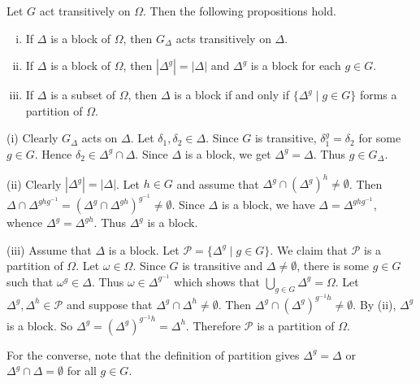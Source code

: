 \begin{proposition} \label{prop-block}
	Let $G$ act transitively on $\Omega$.  Then the following propositions hold.
	\begin{enumerate}[(i)]
		\item If $\Delta$ is a block of $\Omega$, then $G_{\Delta}$ acts transitively on $\Delta$. 
		\item If $\Delta$ is a block of $\Omega$, then $|\Delta^g| = |\Delta|$ and $\Delta^g$ is a block for each $g\in G$. 
		\item If $\Delta$ is a subset of $\Omega$, then $\Delta$ is a block if and only if $\{\Delta^g\mid g\in G\}$ forms a partition of $\Omega$.
	\end{enumerate}  
\end{proposition}
\begin{sketch}
	(i) Clearly $G_{\Delta}$ acts on $\Delta$. Let $\delta_1,\delta_2\in\Delta$. Since $G$ is transitive, $\delta_1^g = \delta_2$ for some $g\in G$. Hence $\delta_2\in \Delta^g\cap \Delta$. Since $\Delta$ is a block, we get $\Delta^g = \Delta$. Thus $g\in G_\Delta$.
	
	(ii) Clearly $|\Delta^g| = |\Delta|$.  Let $h\in G$ and assume that  $\Delta^g \cap (\Delta^g)^h \neq \emptyset$. Then $\Delta \cap \Delta^{g h g^{-1}}  = (\Delta^g \cap \Delta^{gh})^{g^{-1}} \neq \emptyset$. Since $\Delta$ is a block, we have  $\Delta = \Delta^{g h g^{-1}}$, whence $\Delta^g = \Delta^{g h}$. Thus $\Delta^g$ is a block.
	
	(iii) Assume that $\Delta$ is a block. Let $\mathcal{P} = \{\Delta^g \mid g \in G\}$. We claim that $\mathcal{P}$ is a partition of $\Omega$. Let $\omega \in \Omega$. Since $G$ is transitive and $\Delta \neq \emptyset$, there is some $g \in G$ such that $\omega^g \in \Delta$. Thus $\omega \in \Delta^{g^{-1}} $ which shows that $\bigcup_{g \in G} \Delta^g = \Omega$.  Let $\Delta^g, \Delta^h \in \mathcal{P}$ and suppose that $\Delta^g \cap \Delta^h \neq \emptyset$. Then $\Delta^g \cap (\Delta^g)^{g^{-1} h} \neq \emptyset$. By (ii), $\Delta^g$ is a block. So $\Delta^g = (\Delta^g)^{g^{-1} h} = \Delta^h$. Therefore $\mathcal{P}$ is a partition of $\Omega$. 
	
	For the converse, note that the definition of partition gives $\Delta^g = \Delta$ or $\Delta^g \cap \Delta = \emptyset$ for all $g \in G$.
\end{sketch}

